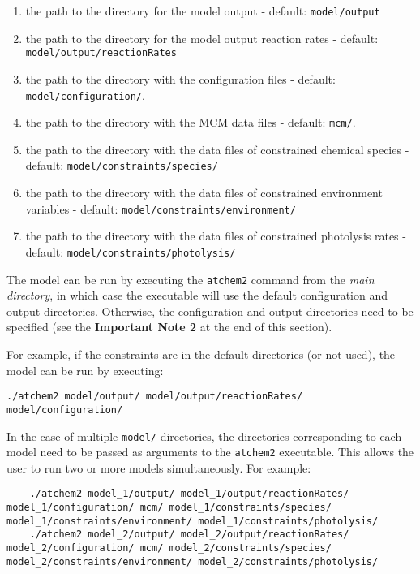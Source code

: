 \begin{enumerate}
\def\labelenumi{\arabic{enumi}.}
\tightlist
\item
  the path to the directory for the model output - default:
  \texttt{model/output}
\item
  the path to the directory for the model output reaction rates -
  default: \texttt{model/output/reactionRates}
\item
  the path to the directory with the configuration files - default:
  \texttt{model/configuration/}.
\item
  the path to the directory with the MCM data files - default:
  \texttt{mcm/}.
\item
  the path to the directory with the data files of constrained chemical
  species - default: \texttt{model/constraints/species/}
\item
  the path to the directory with the data files of constrained
  environment variables - default:
  \texttt{model/constraints/environment/}
\item
  the path to the directory with the data files of constrained
  photolysis rates - default: \texttt{model/constraints/photolysis/}
\end{enumerate}

The model can be run by executing the \texttt{atchem2} command from the
\emph{main directory}, in which case the executable will use the default
configuration and output directories. Otherwise, the configuration and
output directories need to be specified (see the \textbf{Important Note
2} at the end of this section).

For example, if the constraints are in the default directories (or not
used), the model can be run by executing:

\begin{verbatim}
./atchem2 model/output/ model/output/reactionRates/ model/configuration/
\end{verbatim}

In the case of multiple \texttt{model/} directories, the directories
corresponding to each model need to be passed as arguments to the
\texttt{atchem2} executable. This allows the user to run two or more
models simultaneously. For example:

\begin{verbatim}
    ./atchem2 model_1/output/ model_1/output/reactionRates/ model_1/configuration/ mcm/ model_1/constraints/species/ model_1/constraints/environment/ model_1/constraints/photolysis/
    ./atchem2 model_2/output/ model_2/output/reactionRates/ model_2/configuration/ mcm/ model_2/constraints/species/ model_2/constraints/environment/ model_2/constraints/photolysis/
\end{verbatim}

